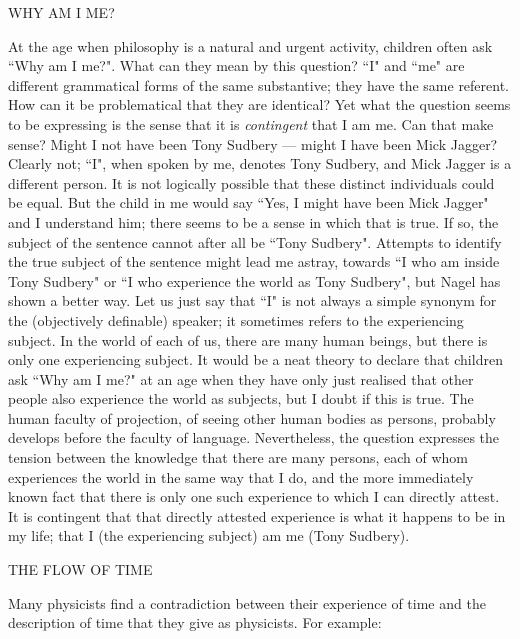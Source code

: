 \documentclass[12pt,a4paper,reqno]{article}
\renewcommand{\(}{\left(}
\renewcommand{\)}{\right)}
\newcommand{\<}{\langle}
\renewcommand{\>}{\rangle}
\theoremstyle{plain} %
\theoremstyle{definition}
\theoremstyle{remark}
\begin{document}
\medskip
\begin{center} WHY AM I ME? \end{center}

At the age when philosophy is a natural and urgent activity, children often ask
``Why am I me?". What can they mean by this question? ``I" and ``me" are
different grammatical forms of the same
substantive; they have the same referent. How can it be problematical
that they are identical? Yet what the question seems to be expressing is
the sense that it is \emph{contingent} that I am me. Can that make
sense? Might I not have been Tony Sudbery --- might I have been Mick
Jagger? Clearly not; ``I", when spoken by me, denotes Tony Sudbery, and
Mick Jagger is a different person. It is not logically possible that
these distinct individuals could be equal. But the child in me would say
``Yes, I might have been Mick Jagger" and I understand him; there seems
to be a
sense in which that is true. If so, the subject of the sentence cannot
after all be ``Tony Sudbery". Attempts to identify the true subject of
the sentence might lead me astray, towards ``I who am inside Tony
Sudbery" or ``I who experience the world as Tony Sudbery", but Nagel has
shown a better way. Let us just say that ``I" is not always a simple 
synonym for the (objectively definable) speaker; it sometimes refers to
the experiencing subject. In the world of each of us, there are many 
human beings, but there is only one experiencing subject. It would be a
neat theory to declare that children ask ``Why am I me?" at an age when
they have only just realised that other people also experience the world
as subjects, but I doubt if this is true. The human faculty of
projection, of seeing other human bodies as persons, probably develops before
the faculty of language. Nevertheless, the question
expresses the tension between the knowledge that there are many persons,
each of whom experiences the world in the same way that I do, and the
more immediately known fact that there is only one such experience to which
I can directly attest. It is contingent that that directly attested
experience is what it happens to be in my life; that I (the experiencing
subject) am me (Tony Sudbery).

\medskip
\begin{center} THE FLOW OF TIME \end{center}

Many physicists find a contradiction between their experience of time
and the description of time that they give as physicists. For example:
\end{document}
